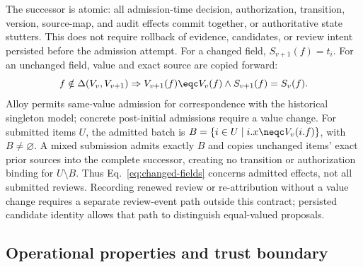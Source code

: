 The successor is atomic: all admission-time decision, authorization, transition, version, source-map, and audit effects commit together, or authoritative state stutters. This does not require rollback of evidence, candidates, or review intent persisted before the admission attempt. For a changed field, $S_{v+1}(f)=t_i$. For an unchanged field, value and exact source are copied forward:
\begin{equation}
f\notin\Delta(V_v,V_{v+1})\Rightarrow
V_{v+1}(f)\eqc V_v(f)\land S_{v+1}(f)=S_v(f).
\label{eq:copy-forward}
\end{equation}
Alloy permits same-value admission for correspondence with the historical singleton model; concrete post-initial admissions require a value change. For submitted items $U$, the admitted batch is $B=\{i\in U\mid i.x\neqc V_v(i.f)\}$, with $B\neq\varnothing$. A mixed submission admits exactly $B$ and copies unchanged items' exact prior sources into the complete successor, creating no transition or authorization binding for $U\setminus B$. Thus Eq.~\eqref{eq:changed-fields} concerns admitted effects, not all submitted reviews. Recording renewed review or re-attribution without a value change requires a separate review-event path outside this contract; persisted candidate identity allows that path to distinguish equal-valued proposals.

\subsection{Operational properties and trust boundary}

